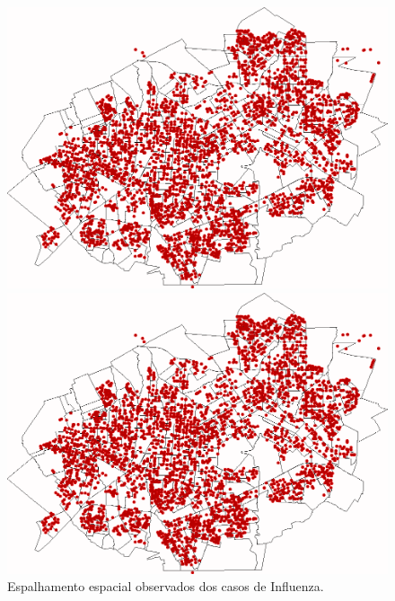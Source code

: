 \begin{figure}[H]
\begin{minipage}{.45\textwidth}
    \centering
    \includegraphics[width=1.0\textwidth]{Figuras/Resultados/Observado/01-11-2009.png}
    \captionsetup{labelformat=empty}
  \end{minipage}%
  \begin{minipage}{.45\textwidth}
    \centering
    \includegraphics[width=1.0\textwidth]{Figuras/Resultados/Observado/01-12-2009.png}
    \captionsetup{labelformat=empty}
  \end{minipage}
  \caption{Espalhamento espacial observados dos casos de Influenza.}
  \label{fig:espacial_observado_0003}
\end{figure}

\newpage
